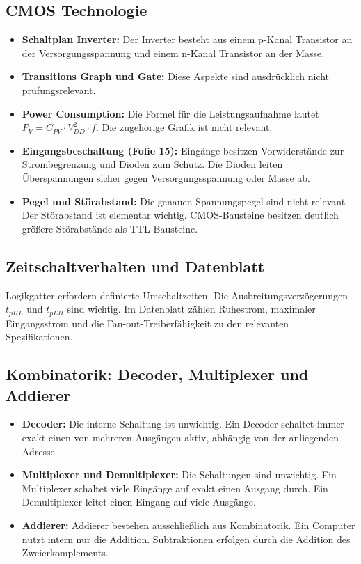 \documentclass[11pt,a4paper]{article}
\begin{document}
\subsection{CMOS Technologie}
\begin{itemize}
    \item \textbf{Schaltplan Inverter:} Der Inverter besteht aus einem p-Kanal Transistor an der Versorgungsspannung und einem n-Kanal Transistor an der Masse.
    \item \textbf{Transitions Graph und Gate:} Diese Aspekte sind ausdrücklich nicht prüfungsrelevant.
    \item \textbf{Power Consumption:} Die Formel für die Leistungsaufnahme lautet $P_{V} = C_{PV} \cdot V_{DD}^2 \cdot f$. Die zugehörige Grafik ist nicht relevant.
    \item \textbf{Eingangsbeschaltung (Folie 15):} Eingänge besitzen Vorwiderstände zur Strombegrenzung und Dioden zum Schutz. Die Dioden leiten Überspannungen sicher gegen Versorgungsspannung oder Masse ab.
    \item \textbf{Pegel und Störabstand:} Die genauen Spannungspegel sind nicht relevant. Der Störabstand ist elementar wichtig. CMOS-Bausteine besitzen deutlich größere Störabstände als TTL-Bausteine.
\end{itemize}

\subsection{Zeitschaltverhalten und Datenblatt}
Logikgatter erfordern definierte Umschaltzeiten. Die Ausbreitungsverzögerungen $t_{pHL}$ und $t_{pLH}$ sind wichtig. Im Datenblatt zählen Ruhestrom, maximaler Eingangsstrom und die Fan-out-Treiberfähigkeit zu den relevanten Spezifikationen.

\subsection{Kombinatorik: Decoder, Multiplexer und Addierer}
\begin{itemize}
    \item \textbf{Decoder:} Die interne Schaltung ist unwichtig. Ein Decoder schaltet immer exakt einen von mehreren Ausgängen aktiv, abhängig von der anliegenden Adresse.
    \item \textbf{Multiplexer und Demultiplexer:} Die Schaltungen sind unwichtig. Ein Multiplexer schaltet viele Eingänge auf exakt einen Ausgang durch. Ein Demultiplexer leitet einen Eingang auf viele Ausgänge.
    \item \textbf{Addierer:} Addierer bestehen ausschließlich aus Kombinatorik. Ein Computer nutzt intern nur die Addition. Subtraktionen erfolgen durch die Addition des Zweierkomplements.
\end{itemize}
\end{document}
